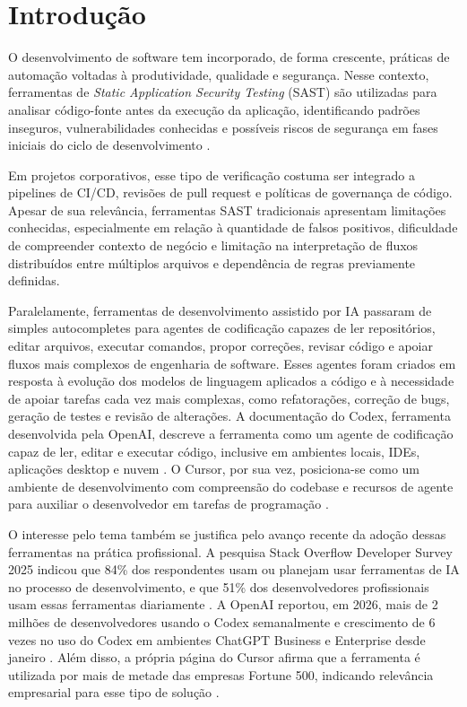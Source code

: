
\chapter[Introdução]{Introdução}

O desenvolvimento de software tem incorporado, de forma crescente, práticas de automação voltadas à produtividade, qualidade e segurança. Nesse contexto, ferramentas de \textit{Static Application Security Testing} (SAST) são utilizadas para analisar código-fonte antes da execução da aplicação, identificando padrões inseguros, vulnerabilidades conhecidas e possíveis riscos de segurança em fases iniciais do ciclo de desenvolvimento \cite{owasp_sast,semgrep_ce}.

Em projetos corporativos, esse tipo de verificação costuma ser integrado a pipelines de CI/CD, revisões de pull request e políticas de governança de código. Apesar de sua relevância, ferramentas SAST tradicionais apresentam limitações conhecidas, especialmente em relação à quantidade de falsos positivos, dificuldade de compreender contexto de negócio e limitação na interpretação de fluxos distribuídos entre múltiplos arquivos e dependência de regras previamente definidas.

Paralelamente, ferramentas de desenvolvimento assistido por IA passaram de simples autocompletes para agentes de codificação capazes de ler repositórios, editar arquivos, executar comandos, propor correções, revisar código e apoiar fluxos mais complexos de engenharia de software. Esses agentes foram criados em resposta à evolução dos modelos de linguagem aplicados a código e à necessidade de apoiar tarefas cada vez mais complexas, como refatorações, correção de bugs, geração de testes e revisão de alterações. A documentação do Codex, ferramenta desenvolvida pela OpenAI, descreve a ferramenta como um agente de codificação capaz de ler, editar e executar código, inclusive em ambientes locais, IDEs, aplicações desktop e nuvem \cite{openai_codex_cloud,openai_codex_cli}. O Cursor, por sua vez, posiciona-se como um ambiente de desenvolvimento com compreensão do codebase e recursos de agente para auxiliar o desenvolvedor em tarefas de programação \cite{cursor_home,cursor_agents}.

O interesse pelo tema também se justifica pelo avanço recente da adoção dessas ferramentas na prática profissional. A pesquisa Stack Overflow Developer Survey 2025 indicou que 84\% dos respondentes usam ou planejam usar ferramentas de IA no processo de desenvolvimento, e que 51\% dos desenvolvedores profissionais usam essas ferramentas diariamente \cite{stackoverflow2025}. A OpenAI reportou, em 2026, mais de 2 milhões de desenvolvedores usando o Codex semanalmente e crescimento de 6 vezes no uso do Codex em ambientes ChatGPT Business e Enterprise desde janeiro \cite{openai_codex_pricing_2026}. Além disso, a própria página do Cursor afirma que a ferramenta é utilizada por mais de metade das empresas Fortune 500, indicando relevância empresarial para esse tipo de solução \cite{cursor_home}.

